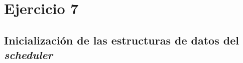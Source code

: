 \section{Ejercicio 7}
\par{}

\subsection*{Inicialización de las estructuras de datos del \textit{scheduler}}
\par{}


\subsection*{}
\par{}

\clearpage